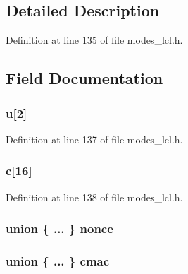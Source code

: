 \subsection{Detailed Description}


Definition at line 135 of file modes\+\_\+lcl.\+h.



\subsection{Field Documentation}
\subsubsection[{\texorpdfstring{u}{u}}]{ u\mbox{[}2\mbox{]}}\hypertarget{structccm128__context_a1c262682a23875ddb957cb140d21df0a}{}\label{structccm128__context_a1c262682a23875ddb957cb140d21df0a}


Definition at line 137 of file modes\+\_\+lcl.\+h.

\subsubsection[{\texorpdfstring{c}{c}}]{ c\mbox{[}16\mbox{]}}\hypertarget{structccm128__context_ae26a622d631b648ed55c8e2338e3a77b}{}\label{structccm128__context_ae26a622d631b648ed55c8e2338e3a77b}


Definition at line 138 of file modes\+\_\+lcl.\+h.

\subsubsection[{\texorpdfstring{nonce}{nonce}}]{\setlength{\rightskip}{0pt plus 5cm}union \{ ... \}   nonce}\hypertarget{structccm128__context_a64aa94548bdb1a2219af06453070503b}{}\label{structccm128__context_a64aa94548bdb1a2219af06453070503b}
\subsubsection[{\texorpdfstring{cmac}{cmac}}]{\setlength{\rightskip}{0pt plus 5cm}union \{ ... \}   cmac}\hypertarget{structccm128__context_a5d04f7edf360c2eee2252b3d8d05023f}{}\label{structccm128__context_a5d04f7edf360c2eee2252b3d8d05023f}
